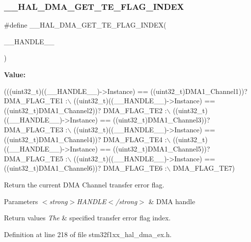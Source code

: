 \subsubsection{\texorpdfstring{\+\_\+\+\_\+\+H\+A\+L\+\_\+\+D\+M\+A\+\_\+\+G\+E\+T\+\_\+\+T\+E\+\_\+\+F\+L\+A\+G\+\_\+\+I\+N\+D\+EX}{\_\_HAL\_DMA\_GET\_TE\_FLAG\_INDEX}}
{\footnotesize\ttfamily \#define \+\_\+\+\_\+\+H\+A\+L\+\_\+\+D\+M\+A\+\_\+\+G\+E\+T\+\_\+\+T\+E\+\_\+\+F\+L\+A\+G\+\_\+\+I\+N\+D\+EX(\begin{DoxyParamCaption}\item[{}]{\+\_\+\+\_\+\+H\+A\+N\+D\+L\+E\+\_\+\+\_\+ }\end{DoxyParamCaption})}

{\bfseries Value\+:}
\begin{DoxyCode}
(((uint32\_t)((\_\_HANDLE\_\_)->Instance) == ((uint32\_t)DMA1\_Channel1))? DMA\_FLAG\_TE1 :\(\backslash\)
 ((uint32\_t)((\_\_HANDLE\_\_)->Instance) == ((uint32\_t)DMA1\_Channel2))? DMA\_FLAG\_TE2 :\(\backslash\)
 ((uint32\_t)((\_\_HANDLE\_\_)->Instance) == ((uint32\_t)DMA1\_Channel3))? DMA\_FLAG\_TE3 :\(\backslash\)
 ((uint32\_t)((\_\_HANDLE\_\_)->Instance) == ((uint32\_t)DMA1\_Channel4))? DMA\_FLAG\_TE4 :\(\backslash\)
 ((uint32\_t)((\_\_HANDLE\_\_)->Instance) == ((uint32\_t)DMA1\_Channel5))? DMA\_FLAG\_TE5 :\(\backslash\)
 ((uint32\_t)((\_\_HANDLE\_\_)->Instance) == ((uint32\_t)DMA1\_Channel6))? DMA\_FLAG\_TE6 :\(\backslash\)
   DMA\_FLAG\_TE7)
\end{DoxyCode}


Return the current D\+MA Channel transfer error flag. 


\begin{DoxyParams}{Parameters}
{\em $<$strong$>$\+H\+A\+N\+D\+L\+E$<$/strong$>$} & D\+MA handle \\
\hline
\end{DoxyParams}

\begin{DoxyRetVals}{Return values}
{\em The} & specified transfer error flag index. \\
\hline
\end{DoxyRetVals}


Definition at line 218 of file stm32f1xx\+\_\+hal\+\_\+dma\+\_\+ex.\+h.

